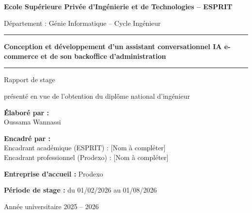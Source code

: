 \begin{titlepage}
\centering

{\large \textbf{Ecole Supérieure Privée d'Ingénierie et de Technologies -- ESPRIT}\par}
\vspace{0.3cm}
{\normalsize Département : Génie Informatique -- Cycle Ingénieur\par}

\vspace{2.5cm}
\rule{\linewidth}{1pt}\par
\vspace{0.6cm}
{\huge \bfseries Conception et développement d'un assistant conversationnel IA e-commerce et de son backoffice d'administration\par}
\vspace{0.6cm}
\rule{\linewidth}{1pt}\par

\vspace{1.5cm}
{\Large Rapport de stage\par}
\vspace{0.3cm}
{\normalsize présenté en vue de l'obtention du diplôme national d'ingénieur\par}

\vspace{2cm}

\begin{minipage}{0.45\textwidth}
\begin{flushleft} \large
\textbf{Élaboré par :}\\
Oussama Wannassi
\end{flushleft}
\end{minipage}
\begin{minipage}{0.45\textwidth}
\begin{flushright} \large
\textbf{Encadré par :}\\
Encadrant académique (ESPRIT) : [Nom à compléter]\\
Encadrant professionnel (Prodexo) : [Nom à compléter]
\end{flushright}
\end{minipage}

\vspace{2cm}

{\normalsize \textbf{Entreprise d'accueil :} Prodexo\par}
{\normalsize \textbf{Période de stage :} du 01/02/2026 au 01/08/2026\par}

\vfill

{\normalsize Année universitaire 2025 -- 2026\par}

\end{titlepage}

\newpage
\thispagestyle{empty}
\mbox{}
